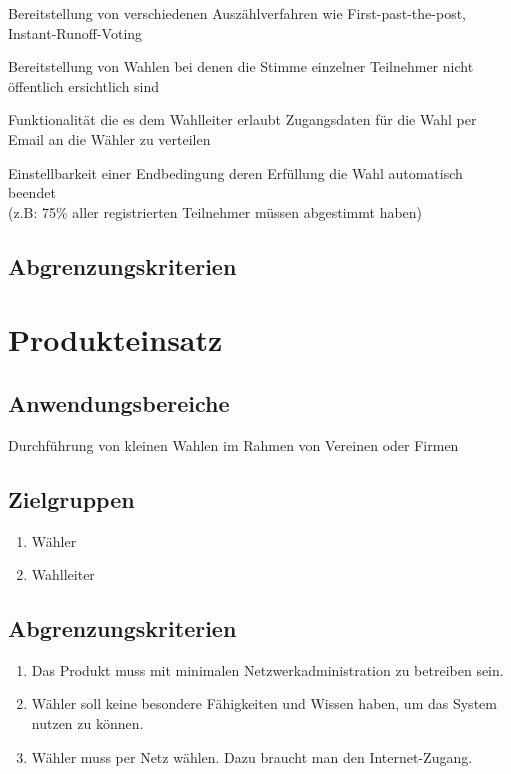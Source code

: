\documentclass[parskip=full,11pt,twoside]{scrartcl}
\begin{document}
Bereitstellung von verschiedenen Auszählverfahren wie First-past-the-post, Instant-Runoff-Voting

Bereitstellung von Wahlen bei denen die Stimme einzelner Teilnehmer nicht öffentlich ersichtlich sind

Funktionalität die es dem Wahlleiter erlaubt Zugangsdaten für die Wahl per Email an die Wähler zu verteilen

Einstellbarkeit einer Endbedingung deren Erfüllung die Wahl automatisch beendet \\(z.B: 75\% aller registrierten Teilnehmer müssen abgestimmt haben)

\subsection{Abgrenzungskriterien}

\section{Produkteinsatz}

\subsection{Anwendungsbereiche}
Durchführung von kleinen Wahlen im Rahmen von Vereinen oder Firmen

\subsection{Zielgruppen}
\begin{enumerate}
  \item Wähler
  \item Wahlleiter
\end{enumerate}

\subsection{Abgrenzungskriterien}
\begin{enumerate}
  \item Das Produkt muss mit minimalen Netzwerkadministration zu betreiben sein.
  \item Wähler soll keine besondere Fähigkeiten und Wissen  haben, um das System nutzen zu können.
  \item Wähler muss per Netz wählen. Dazu braucht man den Internet-Zugang.
\end{enumerate}
\end{document}
